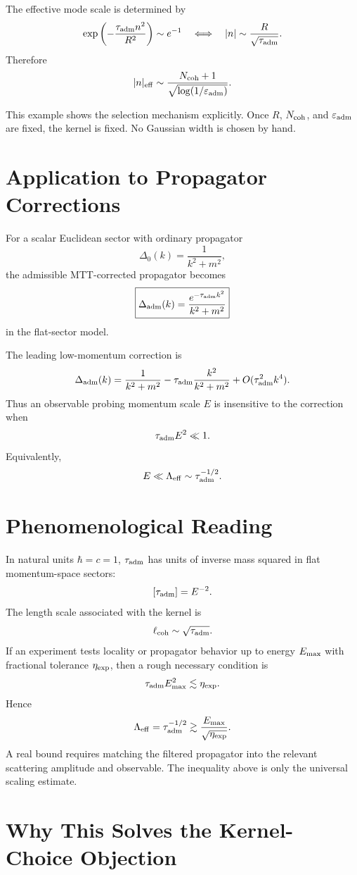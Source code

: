 \documentclass[11pt]{article}
\begin{document}
The effective mode scale is determined by
\[
\exp\left(-\frac{\tau_{\rm adm}n^2}{R^2}\right)\sim e^{-1}
\quad\Longleftrightarrow\quad
|n|\sim \frac{R}{\sqrt{\tau_{\rm adm}}}.
\]
Therefore
\[
|n|_{\rm eff}
\sim
\frac{N_{\rm coh}+1}{\sqrt{\log(1/\varepsilon_{\rm adm})}}.
\]

This example shows the selection mechanism explicitly. Once \(R\), \(N_{\rm coh}\), and \(\varepsilon_{\rm adm}\) are fixed, the kernel is fixed. No Gaussian width is chosen by hand.

\section{Application to Propagator Corrections}

For a scalar Euclidean sector with ordinary propagator
\[
\Delta_0(k)=\frac{1}{k^2+m^2},
\]
the admissible MTT-corrected propagator becomes
\[
\boxed{
\Delta_{\rm adm}(k)
=
\frac{e^{-\tau_{\rm adm}k^2}}{k^2+m^2}
}
\]
in the flat-sector model.

The leading low-momentum correction is
\[
\Delta_{\rm adm}(k)
=
\frac{1}{k^2+m^2}
-
\tau_{\rm adm}\frac{k^2}{k^2+m^2}
+
O(\tau_{\rm adm}^2k^4).
\]
Thus an observable probing momentum scale \(E\) is insensitive to the correction when
\[
\tau_{\rm adm}E^2\ll1.
\]
Equivalently,
\[
E\ll \Lambda_{\rm eff}\sim\tau_{\rm adm}^{-1/2}.
\]

\section{Phenomenological Reading}

In natural units \(\hbar=c=1\), \(\tau_{\rm adm}\) has units of inverse mass squared in flat momentum-space sectors:
\[
[\tau_{\rm adm}]=E^{-2}.
\]
The length scale associated with the kernel is
\[
\ell_{\rm coh}\sim \sqrt{\tau_{\rm adm}}.
\]
If an experiment tests locality or propagator behavior up to energy \(E_{\rm max}\) with fractional tolerance \(\eta_{\rm exp}\), then a rough necessary condition is
\[
\tau_{\rm adm}E_{\rm max}^2\lesssim \eta_{\rm exp}.
\]
Hence
\[
\Lambda_{\rm eff}
=
\tau_{\rm adm}^{-1/2}
\gtrsim
\frac{E_{\rm max}}{\sqrt{\eta_{\rm exp}}}.
\]
A real bound requires matching the filtered propagator into the relevant scattering amplitude and observable. The inequality above is only the universal scaling estimate.

\section{Why This Solves the Kernel-Choice Objection}
\end{document}
